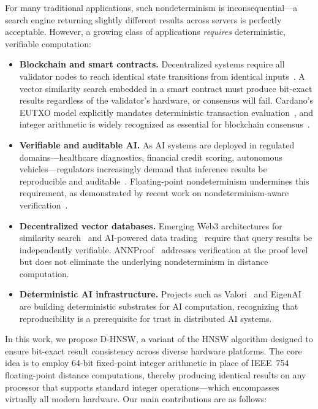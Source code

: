 \documentclass[10pt,journal]{IEEEtran}
\newcommand{\dhnsw}{\textsc{D-HNSW}}
\newcommand{\hnsw}{\textsc{HNSW}}
\begin{document}
For many traditional applications, such nondeterminism is inconsequential---a search engine returning slightly different results across servers is perfectly acceptable. However, a growing class of applications \emph{requires} deterministic, verifiable computation:

\begin{itemize}[leftmargin=*]
  \item \textbf{Blockchain and smart contracts.} Decentralized systems require all validator nodes to reach identical state transitions from identical inputs~\cite{buterin2014ethereum, lai2022blockchain}. A vector similarity search embedded in a smart contract must produce bit-exact results regardless of the validator's hardware, or consensus will fail. Cardano's EUTXO model explicitly mandates deterministic transaction evaluation~\cite{cardano2024fees}, and integer arithmetic is widely recognized as essential for blockchain consensus~\cite{decenomy2024integer}.

  \item \textbf{Verifiable and auditable AI.} As AI systems are deployed in regulated domains---healthcare diagnostics, financial credit scoring, autonomous vehicles---regulators increasingly demand that inference results be reproducible and auditable~\cite{alves2026eigenai}. Floating-point nondeterminism undermines this requirement, as demonstrated by recent work on nondeterminism-aware verification~\cite{yao2025nao}.

  \item \textbf{Decentralized vector databases.} Emerging Web3 architectures for similarity search~\cite{keizer2023ditto, lee2024decentface} and AI-powered data trading~\cite{zhang2024nmft} require that query results be independently verifiable. ANNProof~\cite{lu2024annproof} addresses verification at the proof level but does not eliminate the underlying nondeterminism in distance computation.

  \item \textbf{Deterministic AI infrastructure.} Projects such as Valori~\cite{gudur2025valori} and EigenAI~\cite{alves2026eigenai} are building deterministic substrates for AI computation, recognizing that reproducibility is a prerequisite for trust in distributed AI systems.
\end{itemize}

\noindent In this work, we propose \dhnsw{}, a variant of the \hnsw{} algorithm designed to ensure bit-exact result consistency across diverse hardware platforms. The core idea is to employ 64-bit fixed-point integer arithmetic in place of IEEE~754 floating-point distance computations, thereby producing identical results on any processor that supports standard integer operations---which encompasses virtually all modern hardware. Our main contributions are as follows:
\end{document}

